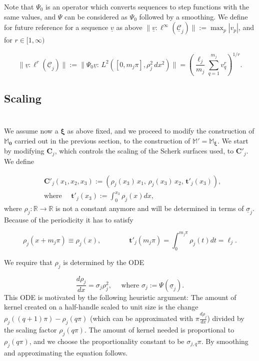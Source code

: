\documentclass[12pt,namelimits,sumlimits]{amsart}
\theoremstyle{remark}
\numberwithin{equation}{section}
\begin{document}
Note that $\Psi_0$ is an operator which converts sequences to step functions with the same values,
and $\Psi$ can be considered as $\Psi_0$ followed by a smoothing.
We define for future reference
for a sequence $\underline{v}$ as above
$\|\underline{v}:\ell^\infty({\underline{{\mathcal{C}}}}_j)\|:=\max_p|v_p|$,
and for $r\in[1,\infty)$
\addtocounter{theorem}{1}
\begin{equation}
\label{Elrnorm}
\|\underline{v}:\ell^r({\underline{{\mathcal{C}}}}_j)\|:=
\|\Psi_0\underline{v}:\, L^2([0,m_j\pi],\rho_j^2 \,dx^2)\|=
\left(\frac{\ell_j}{m_j} \sum_{q=1}^{m_j} v_q^r \right)^{1/r}.
\end{equation}

\subsection*{Scaling}
$\phantom{ab}$
\nopagebreak

We assume now a ${{\boldsymbol{\xi}}}$ as above fixed,
and we proceed to modify the construction of ${\mathbb{M}}_{{\boldsymbol{0}}}$ carried out in the previous
section, to the construction of ${\mathbb{M}}'={\mathbb{M}}_{{\boldsymbol{\xi}}}$.
We start by modifying ${\boldsymbol{C}}_j$, which controls the scaling of the Scherk surfaces used, to ${\boldsymbol{C}}'_j$.
We define 
\addtocounter{theorem}{1}
\begin{equation}
\label{ECCp}
\begin{aligned}
&{\boldsymbol{C}}'_j(x_1,x_2,x_3):=
\left(
\rho_j(x_3)\,x_1,\,\rho_j(x_3)\,x_2,\,{\boldsymbol{t}}'_j(x_3)
\right),
\\
&\text{where }
\quad
{\boldsymbol{t}}'_j(x_3):=
\int_0^{x_3}\rho_j(x)dx,
\end{aligned}
\end{equation}
where $\rho_j:{\mathbb{R}}\to{\mathbb{R}}$ is not a constant anymore 
and will be determined in terms of $\underline{\sigma}_j$.
Because of the periodicity it has to satisfy
\addtocounter{theorem}{1}
\begin{equation}
\label{Erhoperiod}
\rho_j(x+m_j\pi)\equiv\rho_j(x),
\qquad\qquad
{\boldsymbol{t}}'_j(m_j\pi)=
\int_0^{m_j\pi}\rho_j(t)dt=\ell_j.
\end{equation}

We require that $\rho_j$ is determined by the ODE
\addtocounter{theorem}{1}
\begin{equation}
\label{ErhoODE}
\frac {d\rho_j}{dx}=\sigma_j\rho_j^2,
\quad
\text{ where }
\sigma_j:=\Psi(\underline{\sigma}_j).
\end{equation}
This ODE is motivated by the following heuristic argument:
The amount of kernel created on a half-handle scaled to unit size
is the change $\rho_j((q+1)\pi)-\rho_j(q\pi)$ (which can be approximated with
$\pi\frac {d\rho_j}{dx}$)
divided by the scaling factor
${\rho_j(q\pi)}$.
The amount of kernel needed is proportional to ${\rho_j(q\pi)}$,
and we choose the proportionality constant to be $\sigma_{{j,q}}\pi$.
By smoothing and approximating the equation follows.
\end{document}
